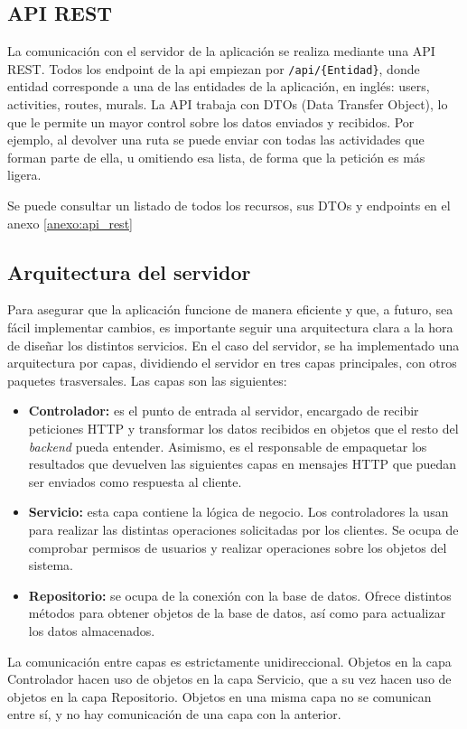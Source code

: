 \subsection{API REST}
La comunicación con el servidor de la aplicación se realiza mediante una API REST. Todos los endpoint de la api empiezan por \texttt{/api/\{Entidad\}}, donde entidad corresponde a una de las entidades de la aplicación, en inglés: users, activities, routes, murals. La API trabaja con DTOs (Data Transfer Object), lo que le permite un mayor control sobre los datos enviados y recibidos. Por ejemplo, al devolver una ruta se puede enviar con todas las actividades que forman parte de ella, u omitiendo esa lista, de forma que la petición es más ligera.

Se puede consultar un listado de todos los recursos, sus DTOs y endpoints en el anexo \ref{anexo:api_rest}

\subsection{Arquitectura del servidor} 
Para asegurar que la aplicación funcione de manera eficiente y que, a futuro, sea fácil implementar cambios, es importante seguir una arquitectura clara a la hora de diseñar los distintos servicios. En el caso del servidor, se ha implementado una arquitectura por capas, dividiendo el servidor en tres capas principales, con otros paquetes trasversales. Las capas son las siguientes:
\begin{itemize}
    \item \textbf{Controlador:} es el punto de entrada al servidor, encargado de recibir peticiones HTTP y transformar los datos recibidos en objetos que el resto del \textit{backend} pueda entender. Asimismo, es el responsable de empaquetar los resultados que devuelven las siguientes capas en mensajes HTTP que puedan ser enviados como respuesta al cliente. 
    \item \textbf{Servicio:} esta capa contiene la lógica de negocio. Los controladores la usan para realizar las distintas operaciones solicitadas por los clientes. Se ocupa de comprobar permisos de usuarios y realizar operaciones sobre los objetos del sistema.  
    \item \textbf{Repositorio:} se ocupa de la conexión con la base de datos. Ofrece distintos métodos para obtener objetos de la base de datos, así como para actualizar los datos almacenados. 
\end{itemize}

La comunicación entre capas es estrictamente unidireccional. Objetos en la capa Controlador hacen uso de objetos en la capa Servicio, que a su vez hacen uso de objetos en la capa Repositorio. Objetos en una misma capa no se comunican entre sí, y no hay comunicación de una capa con la anterior. 

